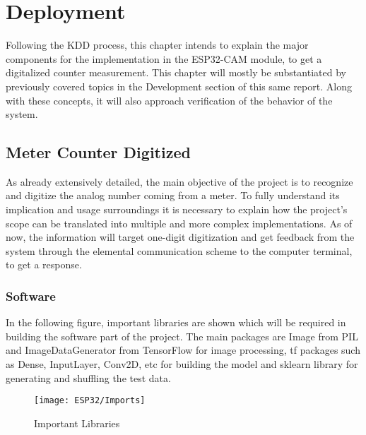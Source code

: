 %
%
%
%

\chapter{Deployment}

Following the KDD process, this chapter intends to explain the major components for the implementation in the ESP32-CAM module, to get a digitalized counter measurement. This chapter will mostly be substantiated by previously covered topics in the Development section of this same report. Along with these concepts, it will also approach verification of the behavior of the system. 

\section{Meter Counter Digitized}
As already extensively detailed, the main objective of the project is to recognize and digitize the analog number coming from a meter. To fully understand its implication and usage surroundings it is necessary to explain how the project's scope can be translated into multiple and more complex implementations. As of now, the information will target one-digit digitization and get feedback from the system through the elemental communication scheme to the computer terminal, to get a response.

\subsection{Software}
In the following figure, important libraries are shown which will be required in building the software part of the project. The main packages are  Image from \ac{PIL} and ImageDataGenerator from TensorFlow for image processing, \ac{tf} packages such as Dense, InputLayer, Conv2D, etc for building the model and sklearn library for generating and shuffling the test data.

\begin{figure}  
	\begin{center}
		\texttt{[image: ESP32/Imports]}
		\caption{Important Libraries} \label{fig:Imports}
	\end{center}
\end{figure}

